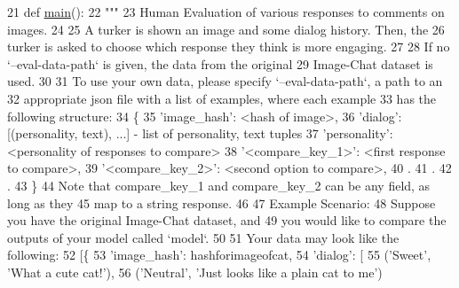 \begin{DoxyCode}
21 \textcolor{keyword}{def }\hyperlink{namespaceprojects_1_1wizard__of__wikipedia_1_1mturk__evaluation__task_1_1run_ad3ab2c71f8083c3112815c0b363d316b}{main}():
22     \textcolor{stringliteral}{"""}
23 \textcolor{stringliteral}{    Human Evaluation of various responses to comments on images.}
24 \textcolor{stringliteral}{}
25 \textcolor{stringliteral}{    A turker is shown an image and some dialog history. Then, the}
26 \textcolor{stringliteral}{    turker is asked to choose which response they think is more engaging.}
27 \textcolor{stringliteral}{}
28 \textcolor{stringliteral}{    If no `--eval-data-path` is given, the data from the original}
29 \textcolor{stringliteral}{    Image-Chat dataset is used.}
30 \textcolor{stringliteral}{}
31 \textcolor{stringliteral}{    To use your own data, please specify `--eval-data-path`, a path to an}
32 \textcolor{stringliteral}{    appropriate json file with a list of examples, where each example}
33 \textcolor{stringliteral}{    has the following structure:}
34 \textcolor{stringliteral}{        \{}
35 \textcolor{stringliteral}{            'image\_hash': <hash of image>,}
36 \textcolor{stringliteral}{            'dialog': [(personality, text), ...] - list of personality, text tuples}
37 \textcolor{stringliteral}{            'personality': <personality of responses to compare>}
38 \textcolor{stringliteral}{            '<compare\_key\_1>': <first response to compare>,}
39 \textcolor{stringliteral}{            '<compare\_key\_2>': <second option to compare>,}
40 \textcolor{stringliteral}{            .}
41 \textcolor{stringliteral}{            .}
42 \textcolor{stringliteral}{            .}
43 \textcolor{stringliteral}{        \}}
44 \textcolor{stringliteral}{    Note that compare\_key\_1 and compare\_key\_2 can be any field, as long as they}
45 \textcolor{stringliteral}{    map to a string response.}
46 \textcolor{stringliteral}{}
47 \textcolor{stringliteral}{    Example Scenario:}
48 \textcolor{stringliteral}{        Suppose you have the original Image-Chat dataset, and}
49 \textcolor{stringliteral}{        you would like to compare the outputs of your model called `model`.}
50 \textcolor{stringliteral}{}
51 \textcolor{stringliteral}{        Your data may look like the following:}
52 \textcolor{stringliteral}{        [\{}
53 \textcolor{stringliteral}{            'image\_hash': hashforimageofcat,}
54 \textcolor{stringliteral}{            'dialog': [}
55 \textcolor{stringliteral}{                ('Sweet', 'What a cute cat!'),}
56 \textcolor{stringliteral}{                ('Neutral', 'Just looks like a plain cat to me')}

\end{DoxyCode}
